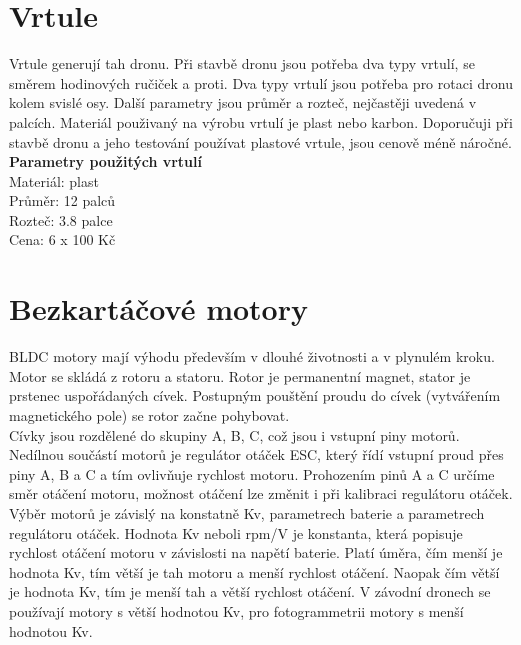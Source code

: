 \section{Vrtule} 
Vrtule generují tah dronu. Při stavbě dronu jsou potřeba dva typy vrtulí, se směrem hodinových ručiček a proti. Dva typy vrtulí jsou potřeba pro rotaci dronu kolem svislé osy. Další parametry jsou průměr a rozteč, nejčastěji uvedená v palcích. Materiál použivaný na výrobu vrtulí je plast nebo karbon. Doporučuji při stavbě dronu a jeho testování používat plastové vrtule, jsou cenově méně náročné.\\

\textbf{Parametry použitých vrtulí}\\
Materiál: plast\\
Průměr: 12 palců\\
Rozteč: 3.8 palce\\
Cena: 6 x 100 Kč\\

\section{Bezkartáčové motory} 
BLDC motory mají výhodu především v dlouhé životnosti a v plynulém kroku. Motor se skládá z rotoru a statoru. Rotor je permanentní magnet, stator je prstenec uspořádaných cívek. Postupným pouštění proudu do cívek (vytvářením magnetického pole) se rotor začne pohybovat.\\
Cívky jsou rozdělené do skupiny A, B, C, což jsou i vstupní piny motorů.  Nedílnou součástí motorů je regulátor otáček ESC, který řídí vstupní proud přes piny A, B a C a tím ovlivňuje rychlost motoru. Prohozením pinů A a C určíme směr otáčení motoru, možnost otáčení lze změnit i při kalibraci regulátoru otáček.\cite{learnengineering}\\
Výběr motorů je závislý na konstatně Kv, parametrech baterie a parametrech regulátoru otáček. Hodnota Kv neboli rpm/V je konstanta, která popisuje rychlost otáčení motoru v závislosti na napětí baterie. Platí úměra, čím menší je hodnota Kv, tím větší je tah motoru  a menší rychlost otáčení. Naopak čím  větší je hodnota Kv, tím je menší tah a větší rychlost otáčení. V závodní dronech se používají motory s větší hodnotou Kv, pro fotogrammetrii motory s menší hodnotou Kv.\cite{kv} \cite{siieefpv}\\

